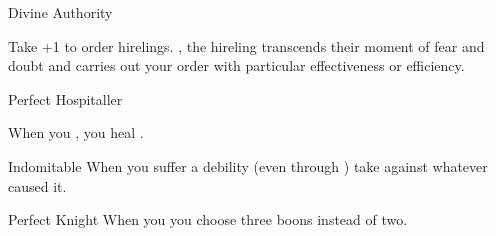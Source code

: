 \documentclass[8pt]{extarticle}
\begin{document}
\begin{multicols}{2}
\begin{amove}{Divine Authority}

  Take +1 to order hirelings. \onMassiveSuccess, the hireling
  transcends their moment of fear and doubt and carries out your order
  with particular effectiveness or efficiency.
\end{amove}

\begin{amove}{Perfect Hospitaller}

  When you , you heal .
\end{amove}

\begin{amove}{Indomitable}
  When you suffer a debility (even through ) take
   against whatever caused it.
\end{amove}

\begin{amove}{Perfect Knight}
  When you  you choose three boons instead of two.
\end{amove}


\vfill\null
\end{multicols}
\end{document}
